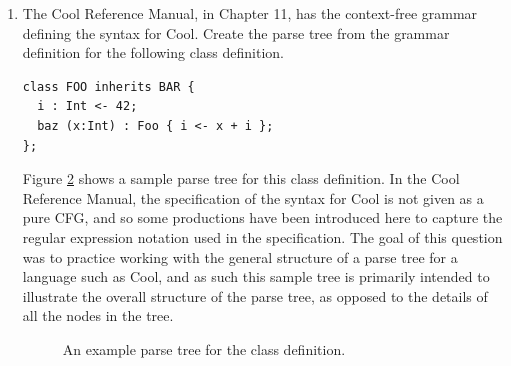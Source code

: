 \documentclass[11pt]{article}
\begin{document}
\begin{enumerate}
\begin{enumerate}
\item Show that this grammar is ambiguous by giving a string that can
be parsed in two different ways.  Draw both parse trees.

The string $abcd$ has the two parse trees shown in Figure \ref{ambig}.
\begin{figure}[htb]
\begin{center}

\caption{Two parse trees for the string $abcd$.}
\label{ambig}
\end{center}
\end{figure}

\item Give an unambiguous grammar that generates the same language as
the grammar above.
\begin{eqnarray*}
S & \rightarrow & AM \mid MD \mid F \\
A & \rightarrow & Aa \mid a \\
B & \rightarrow & Bb \mid b \\
C & \rightarrow & Cc \mid c \\
D & \rightarrow & Dd \mid d \\
E & \rightarrow & bEc \mid bc \\
F & \rightarrow & aFd \mid BC \\
M & \rightarrow & aMd \mid aEd
\end{eqnarray*}

\end{enumerate}

\item The Cool Reference Manual, in Chapter 11, has the context-free
grammar defining the syntax for Cool.  Create the parse tree from the
grammar definition for the following class definition.

\begin{verbatim}
class FOO inherits BAR {
  i : Int <- 42;
  baz (x:Int) : Foo { i <- x + i }; 
};
\end{verbatim}

Figure \ref{classparse} shows a sample parse tree for this class
definition.  In the Cool Reference Manual, the specification of the
syntax for Cool is not given as a pure CFG, and so some productions
have been introduced here to capture the regular expression notation
used in the specification.  The goal of this question was to practice
working with the general structure of a parse tree for a language such
as Cool, and as such this sample tree is primarily intended to
illustrate the overall structure of the parse tree, as opposed to the
details of all the nodes in the tree.
\begin{figure}[htb]
\begin{center}

\caption{An example parse tree for the class definition.}
\label{classparse}
\end{center}
\end{figure}


\end{enumerate}
\end{document}
